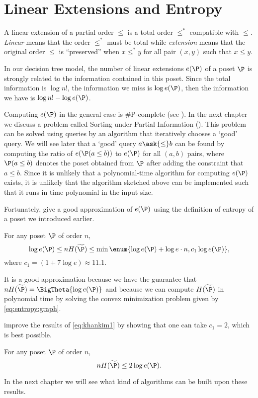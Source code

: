 \section{Linear Extensions and Entropy}

A linear extension of a partial order $\leq$ is a total order $\leq^*$
compatible with $\leq$. \emph{Linear} means that the order $\leq^*$ must be
total while \emph{extension} means that the original order $\leq$ is
``preserved'' \ie when \(x \leq^* y\) for all pair \((x,y)\) such that \(x
\leq y\).

In our decision tree model, the number of linear extensions $e(\P)$ of a poset
$\P$ is strongly related to the information contained in this poset. Since the
total information is $\log n!$, the information we miss is $\log e(\P)$, then
the information we have is $\log n! - \log e(\P)$.

Computing $e(\P)$ in the general case is \#P-complete
(see \citet*{brightwell1991counting}). In the next chapter we discuss a
problem called Sorting under Partial Information (\SUPI). This problem can be solved using \BigO{\ITLB}
queries by an algorithm that
iteratively chooses a `good' query. We will see later that a `good' query \(a \ask{\le} b\) can be
found by computing the ratio of \(e(\P(a \le b))\) to \(e(\P)\) for all \((a,b)\) pairs, where
\(\P(a \le b)\) denotes the poset obtained
from \(\P\) after adding the constraint that \(a \le b\).
Since it is unlikely that
a polynomial-time algorithm for computing \(e(\P)\) exists, it is unlikely that
the algorithm sketched above
can be implemented such that it runs in time polynomial in the input size.

Fortunately, \citet*{kahn:1995} give a good
approximation of $e(\P)$ using the definition of entropy of a poset we
introduced earlier.
\begin{theorem}
\label{eq:khankim1}
For any poset \(\P\) of order \(n\),
\begin{displaymath}
\log e(\P) \le n H(\widetilde{\P}) \le \min\enum{\log e(\P) + \log e \cdot n, c_1
\log e(\P)},
\end{displaymath}
where \(c_1 = (1 + 7 \log e) \approx 11.1\).
\end{theorem}

It is a good approximation because we have the guarantee that
\(n H(\widetilde{\P}) = \BigTheta{\log e(\P)}\) and because we can compute
\(H(\widetilde{\P})\) in polynomial time by solving the convex minimization
problem given by \ref{eq:entropy:graph}.

\citet*{cardinal:2013} improve the results of \ref{eq:khankim1} by showing that
one can take \(c_1 = 2\), which is best possible.
\begin{theorem}
For any poset \(\P\) of order \(n\),
\begin{displaymath}
n H(\widetilde{\P}) \le 2 \log e(\P).
\end{displaymath}
\end{theorem}

In the next chapter we will see what kind of algorithms can be built upon
these results.
